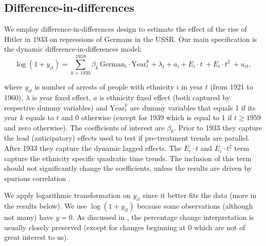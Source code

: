 \subsection{Difference-in-differences}
We employ difference-in-differences design to estimate the effect of the rise of Hitler in 1933 on repressions of Germans in the USSR. 
Our main specification is the dynamic difference-in-differences model:
\begin{equation}
 \log\left(1 + y_{it}\right) = \sum_{k= 1930}^{1959} \beta_k \, \text{German}_{i} \cdot \text{Year}_{t}^k + \lambda_t + a_i +  E_i \cdot t \:  + E_i \cdot t^2 \:    + u_{it},
 \label{eq:dynamic_did}
\end{equation}


where $y_{it}$ is number of arrests of people with ethnicity $i$ in year $t$ (from 1921 to 1960), $\lambda$ is year fixed effect, $a$ is ethnicity fixed effect (both captured by respective dummy variables) and  $\text{Year}_{t}^k$ are dummy variables that equals 1 if its year $k$ equals to $t$ and 0 otherwise (except for 1939 which is equal to 1 if $t \geq 1959$ and zero otherwise). The coefficients of interest are $\beta_k$. 
Prior to  1933 they capture the lead (anticipatory) effects  used to test if pre-treatment trends are parallel. After 1933 they capture the dynamic lagged effects.
The $ E_i \cdot t$ and $ E_i \cdot t^2$  term capture the ethnicity specific quadratic time trends. The inclusion of this term should not significantly  change the coefficients, unless the results are driven by spurious correlation \citep{angrist_mostly_2009}. 

 We apply logarithmic transformation on $y_{it}$ since it better fits the data (more in the results below).  We use $\log\left(1 + y_{it}\right)$ because some observations (although not many) have $y = 0$. As discussed in \citet[p. 193]{wooldridge_introductory_2015},  the percentage change interpretation is usually  closely preserved (except for changes beginning at 0 which are not of great interest to us).   

